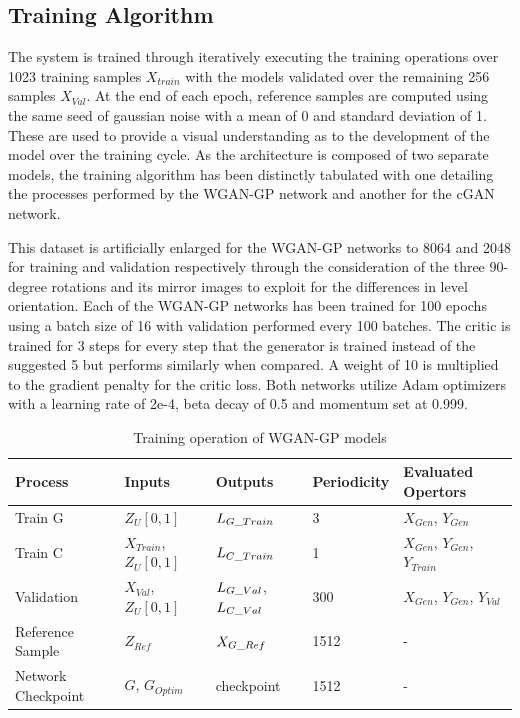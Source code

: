 \documentclass{Configuration_Files/PoliMi3i_thesis}
\begin{document}
\subsection{Training Algorithm}
The system is trained through iteratively executing the training operations over 1023
training samples $X_{train}$ with the models validated over the remaining 256 samples 
$X_{Val}$. At the end of each epoch, reference samples are computed using the same 
seed of gaussian noise with a mean of 0 and standard deviation of 1. These are used to 
provide a visual understanding as to the development of the model over the training cycle. 
As the architecture is composed of two separate models, the training algorithm has been 
distinctly tabulated with one detailing the processes performed by the WGAN-GP network and 
another for the cGAN network.

This dataset is artificially enlarged for the WGAN-GP networks to 8064 and 2048 
for training and validation respectively through the consideration of the three 
90-degree rotations and its mirror images to exploit for the differences in level 
orientation. Each of the WGAN-GP networks has been trained for 
100 epochs using a batch size of 16 with validation performed every 100 batches. 
The critic is trained for 3 steps for every step that the generator is trained instead of the 
suggested 5 but performs similarly when compared. A weight of 10 is multiplied to the 
gradient penalty for the critic loss. Both networks utilize Adam optimizers with a learning 
rate of 2e-4, beta decay of 0.5 and momentum set at 0.999.
\begin{table}[H]
\centering 
\begin{tabular}{ |C{2.5cm}|C{2.5cm}|C{2.5cm}|C{2.5cm}|C{2.5cm}|}
\hline
\textbf{Process} & \textbf{Inputs} & \textbf{Outputs} & \textbf{Periodicity} & \textbf{Evaluated Opertors} \\
\hline
Train G & $Z_{U}[0,1]$ & $L_{G\char`_Train}$ & 3 & $X_{Gen}$, $Y_{Gen}$\\
\hline
Train C & $X_{Train}$, $Z_{U}[0,1]$ & $L_{C\char`_Train}$ & 1 & $X_{Gen}$, $Y_{Gen}$, $Y_{Train}$\\
\hline
Validation & $X_{Val}$, $Z_{U}[0,1]$ & $L_{G\char`_Val}$, $L_{C\char`_Val}$ & 300 & $X_{Gen}$, $Y_{Gen}$, $Y_{Val}$\\
\hline
Reference Sample & $Z_{Ref}$ & $X_{G\char`_Ref}$ & 1512 & -\\
\hline
Network Checkpoint & $G$, $G_{Optim}$ & checkpoint & 1512 & -\\
\hline
\end{tabular}
\\[10pt]
\caption{Training operation of WGAN-GP models}
\label{table:wgantrain}
\end{table}
\newpage
\end{document}
